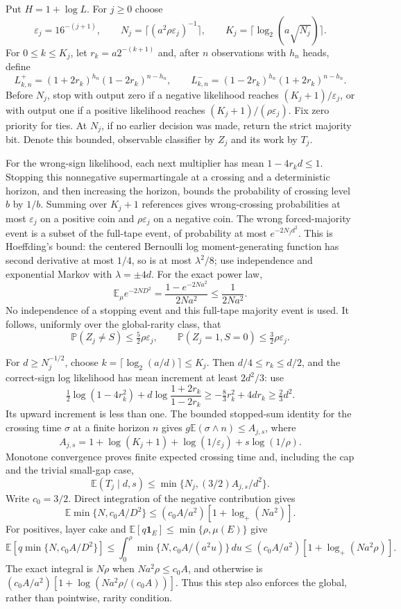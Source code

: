 \documentclass[11pt]{article}
\newcommand{\E}{\mathbb E}
\newcommand{\Pp}{\mathbb P}
\newcommand{\ind}{\mathbf1}
\begin{document}
Put $H=1+\log L$. For $j\ge0$ choose
\[
 \varepsilon_j=16^{-(j+1)},\qquad
 N_j=\lceil(a^2\rho\varepsilon_j)^{-1}\rceil,\qquad
 K_j=\lceil\log_2(a\sqrt{N_j})\rceil.
\]
For $0\le k\le K_j$, let $r_k=a2^{-(k+1)}$ and, after $n$ observations
with $h_n$ heads, define
\[
 L^+_{k,n}=(1+2r_k)^{h_n}(1-2r_k)^{n-h_n},\qquad
 L^-_{k,n}=(1-2r_k)^{h_n}(1+2r_k)^{n-h_n}.
\]
Before $N_j$, stop with output zero if a negative likelihood reaches
$(K_j+1)/\varepsilon_j$, or with output one if a positive likelihood reaches
$(K_j+1)/(\rho\varepsilon_j)$. Fix zero priority for ties. At $N_j$, if no
earlier decision was made, return the strict majority bit. Denote this bounded,
observable classifier by $Z_j$ and its work by $T_j$.

For the wrong-sign likelihood, each next multiplier has mean $1-4r_kd\le1$.
Stopping this nonnegative supermartingale at a crossing and a deterministic
horizon, and then increasing the horizon, bounds the probability of crossing
level $b$ by $1/b$. Summing over $K_j+1$ references gives wrong-crossing
probabilities at most $\varepsilon_j$ on a positive coin and
$\rho\varepsilon_j$ on a negative coin. The wrong forced-majority event is
a subset of the full-tape event, of probability at most $e^{-2N_jd^2}$.
This is Hoeffding's bound: the centered Bernoulli log moment-generating
function has second derivative at most $1/4$, so is at most $\lambda^2/8$;
use independence and exponential Markov with $\lambda=\pm4d$.
For the exact power law,
\[
 \E_\mu e^{-2ND^2}=\frac{1-e^{-2Na^2}}{2Na^2}\le\frac1{2Na^2}.
\]
No independence of a stopping event and this full-tape majority event is used.
It follows, uniformly over the global-rarity class, that
\[
 \Pp(Z_j\ne S)\le\tfrac52\rho\varepsilon_j,
 \qquad \Pp(Z_j=1,S=0)\le\tfrac32\rho\varepsilon_j.       \tag{11}
\]

For $d\ge N_j^{-1/2}$, choose $k=\lceil\log_2(a/d)\rceil\le K_j$.
Then $d/4\le r_k\le d/2$, and the correct-sign log likelihood has mean
increment at least $2d^2/3$: use
\[
 \tfrac12\log(1-4r_k^2)
       +d\log\frac{1+2r_k}{1-2r_k}
 \ge-\tfrac83r_k^2+4dr_k\ge\tfrac23d^2.
\]
Its upward increment is less than one. The bounded stopped-sum identity for
the crossing time $\sigma$ at a finite horizon $n$ gives
$g\E(\sigma\wedge n)\le A_{j,s}$, where
\[
 A_{j,s}=1+\log(K_j+1)+\log(1/\varepsilon_j)+s\log(1/\rho).
\]
Monotone convergence proves finite expected crossing time and, including the
cap and the trivial small-gap case,
\[
 \E(T_j\mid d,s)\le\min\{N_j,(3/2)A_{j,s}/d^2\}.        \tag{12}
\]
Write $c_0=3/2$. Direct integration of the negative contribution gives
\[
 \E\min\{N,c_0A/D^2\}
 \le(c_0A/a^2)[1+\log_+(Na^2)].
\]
For positives, layer cake and
$\E[q\ind_E]\le\min\{\rho,\mu(E)\}$ give
\[
 \E[q\min\{N,c_0A/D^2\}]
 \le\int_0^\rho\min\{N,c_0A/(a^2u)\}\,du
 \le(c_0A/a^2)[1+\log_+(Na^2\rho)].
\]
The exact integral is $N\rho$ when $Na^2\rho\le c_0A$, and otherwise is
$(c_0A/a^2)[1+\log(Na^2\rho/(c_0A))]$. Thus this step also enforces the
global, rather than pointwise, rarity condition.
\end{document}
